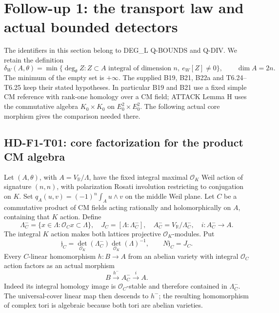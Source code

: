 \section{Follow-up 1: the transport law and actual bounded detectors}
\label{sec:f1-transport}

The identifiers in this section belong to DEG\_L Q-BOUNDS and Q-DIV.
We retain the definition
\[
 \delta_W(A,\theta)=\min\{\deg_\theta Z:
       Z\subset A\text{ integral of dimension }n,
       \ e_W[Z]\ne0\},\qquad \dim A=2n.
\]
The minimum of the empty set is $+\infty$.
The supplied B19, B21, B22a and T6.24--T6.25 keep their stated
hypotheses. In particular B19 and B21 use a fixed simple CM reference
with rank-one homology over a CM field; ATTACK Lemma H uses the
commutative algebra $K_0\times K_0$ on $E_0^2\times E_0^2$.
The following actual core morphism gives the comparison needed there.

\subsection{HD-F1-T01: core factorization for the product CM algebra}

Let $(A,\theta)$, with $A=V_{\mathbb R}/\Lambda$, have the fixed
integral maximal $\mathcal O_K$ Weil action of signature $(n,n)$,
with polarization Rosati involution restricting to conjugation on $K$.
Set $q_A(u,v)=(-1)^n\int_Au\wedge v$ on the middle Weil plane.
Let $C$ be a
commutative product of CM fields acting rationally and holomorphically
on $A$, containing that $K$ action. Define
\[
 \Lambda^-_C=\{x\in\Lambda:\mathcal O_Cx\subset\Lambda\},\quad
 J_C=[\Lambda:\Lambda^-_C],\quad
 A^-_C=V_{\mathbb R}/\Lambda^-_C,
 \quad i:A^-_C\longrightarrow A.
\]
The integral $K$ action makes both lattices projective
$\mathcal O_K$-modules. Put
\[
 \mathfrak j_C=\det_{\mathcal O_K}(\Lambda^-_C)
                  \det_{\mathcal O_K}(\Lambda)^{-1},
 \qquad N\mathfrak j_C=J_C.
\]
Every $C$-linear homomorphism $h:B\to A$ from an abelian variety
with integral $\mathcal O_C$ action factors as an actual morphism
\[
 B\xrightarrow{h^-}A^-_C\xrightarrow{i}A.
 \tag{F1T1.1}
\]
Indeed its integral homology image is $\mathcal O_C$-stable and
therefore contained in $\Lambda^-_C$. The universal-cover linear map
then descends to $h^-$; the resulting homomorphism of complex tori is
algebraic because both tori are abelian varieties.

